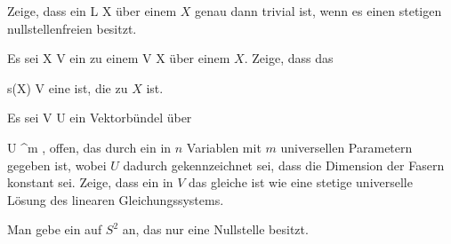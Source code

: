 \setcounter{section}{2}


{}
{





Zeige, dass ein
\maabb {} { L } { X
} {}
über einem
$X$ genau dann trivial ist, wenn es einen stetigen nullstellenfreien
besitzt.





}
{} {}

{}
{





Es sei
 { X } { V
} {}
ein
zu einem
 { V } { X
} {}
über einem
$X$. Zeige, dass das

\mavergleichskette
{\vergleichskette
{s(X)
}
{ \subseteq }{ V
}
{  }{
}
{    }{
}
{   }{
}
}
{}{}{}
eine
ist, die
zu $X$ ist.





}
{} {}

{}
{





Es sei
 { V } { U
} {}
ein Vektorbündel über

\mavergleichskette
{\vergleichskette
{U
}
{ \subseteq }{\R^m
}
{  }{
}
{    }{
}
{   }{
}
}
{}{}{,}
offen, das durch ein
in $n$ Variablen mit $m$ universellen Parametern gegeben ist, wobei $U$ dadurch gekennzeichnet sei, dass die Dimension der Fasern konstant sei. Zeige, dass ein
in $V$ das gleiche ist wie eine stetige universelle Lösung des linearen Gleichungssystems.





}
{} {}

{}
{





Man gebe ein
 
auf $S^2$ an, das nur eine Nullstelle besitzt.





}
{} {}

